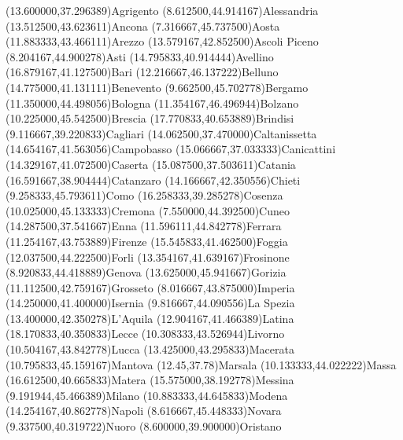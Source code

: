 \mapputIIID[90](13.600000,37.296389){Agrigento}
\mapputIIID[0](8.612500,44.914167){Alessandria}
\mapputIIID[90](13.512500,43.623611){Ancona }
\mapputIIID[90](7.316667,45.737500){Aosta}
\mapputIIID[90](11.883333,43.466111){Arezzo}
\mapputIIID[90](13.579167,42.852500){Ascoli Piceno}
\mapputIIID[90](8.204167,44.900278){Asti}
\mapputIIID[90](14.795833,40.914444){Avellino}
\mapputIIID[90](16.879167,41.127500){Bari}
\mapputIIID[90](12.216667,46.137222){Belluno}
\mapputIIID[90](14.775000,41.131111){Benevento}
\mapputIIID[70](9.662500,45.702778){Bergamo}
\mapputIIID[-90](11.350000,44.498056){Bologna}
\mapputIIID[90](11.354167,46.496944){Bolzano}
\mapputIIID[90](10.225000,45.542500){Brescia}
\mapputIIID[90](17.770833,40.653889){Brindisi}
\mapputIIID[90](9.116667,39.220833){Cagliari}
\mapputIIID[90](14.062500,37.470000){Caltanissetta}
\mapputIIID[90](14.654167,41.563056){Campobasso}
\mapputIIID[-180](15.066667,37.033333){Canicattini}%
\mapputIIID[90](14.329167,41.072500){Caserta}
\mapputIIID[90](15.087500,37.503611){Catania}
\mapputIIID[90](16.591667,38.904444){Catanzaro}
\mapputIIID[90](14.166667,42.350556){Chieti}
\mapputIIID[90](9.258333,45.793611){Como}
\mapputIIID[90](16.258333,39.285278){Cosenza}
\mapputIIID[90](10.025000,45.133333){Cremona}
\mapputIIID[90](7.550000,44.392500){Cuneo}
\mapputIIID[90](14.287500,37.541667){Enna}
\mapputIIID[90](11.596111,44.842778){Ferrara}
\mapputIIID[90](11.254167,43.753889){Firenze}
\mapputIIID[90](15.545833,41.462500){Foggia}
\mapputIIID[90](12.037500,44.222500){Forli}
\mapputIIID[90](13.354167,41.639167){Frosinone}
\mapputIIID[90](8.920833,44.418889){Genova}
\mapputIIID[90](13.625000,45.941667){Gorizia}
\mapputIIID[90](11.112500,42.759167){Grosseto}
\mapputIIID[90](8.016667,43.875000){Imperia}
\mapputIIID[90](14.250000,41.400000){Isernia}
\mapputIIID[90](9.816667,44.090556){La Spezia}
\mapputIIID[90](13.400000,42.350278){L'Aquila}
\mapputIIID[90](12.904167,41.466389){Latina}
\mapputIIID[90](18.170833,40.350833){Lecce}
\mapputIIID[90](10.308333,43.526944){Livorno}
\mapputIIID[90](10.504167,43.842778){Lucca}
\mapputIIID[90](13.425000,43.295833){Macerata}
\mapputIIID[90](10.795833,45.159167){Mantova}
\mapputIIID[0](12.45,37.78){Marsala}
\mapputIIID[90](10.133333,44.022222){Massa}
\mapputIIID[90](16.612500,40.665833){Matera}
\mapputIIID[90](15.575000,38.192778){Messina}
\mapputIIID[90](9.191944,45.466389){Milano}
\mapputIIID[-90](10.883333,44.645833){Modena}
\mapputIIID[90](14.254167,40.862778){Napoli}
\mapputIIID[90](8.616667,45.448333){Novara}
\mapputIIID[90](9.337500,40.319722){Nuoro}
\mapputIIID[90](8.600000,39.900000){Oristano}
